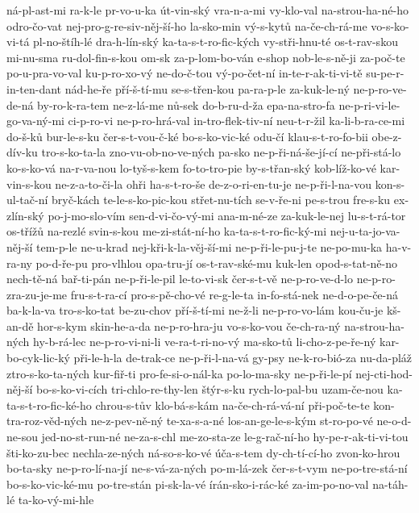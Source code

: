 {ná-pl-ast-mi
ra-k-le
pr-vo-u-ka
út-vin-ský
vra-n-a-mi
vy-klo-val
na-strou-ha-né-ho
odro-čo-vat
nej-pro-g-re-siv-něj-ší-ho
la-sko-min
vý-s-kytů
na-če-ch-rá-me
vo-s-ko-vi-tá
pl-no-štíh-lé
dra-h-lín-ský
ka-ta-s-t-ro-fic-kých
vy-stři-hnu-té
os-t-rav-skou
mi-nu-sma
ru-dol-fin-s-kou
om-sk
za-p-lom-bo-ván
e-shop
nob-le-s-ně-ji
za-poč-te
po-u-pra-vo-val
ku-p-ro-xo-vý
ne-do-č-tou
vý-po-čet-ní
in-te-r-ak-ti-vi-tě
su-pe-r-in-ten-dant
nád-he-ře
pří-š-tí-mu
se-s-třen-kou
pa-ra-p-le
za-kuk-le-ný
ne-p-ro-ve-de-ná
by-ro-k-ra-tem
ne-z-lá-me
nů-sek
do-b-ru-d-ža
epa-na-stro-fa
ne-p-ri-vi-le-go-va-ný-mi
ci-p-ro-vi
ne-p-ro-hrá-val
in-tro-flek-tiv-ní
neu-t-r-žil
ka-li-b-ra-ce-mi
do-š-ků
bur-le-s-ku
čer-s-t-vou-č-ké
bo-s-ko-vic-ké
odu-čí
klau-s-t-ro-fo-bii
obe-z-dív-ku
tro-s-ko-ta-la
zno-vu-ob-no-ve-ných
pa-sko
ne-p-ři-ná-še-jí-cí
ne-při-stá-lo
ko-s-ko-vá
na-r-va-nou
lo-tyš-s-kem
fo-to-tro-pie
by-s-třan-ský
kob-líž-ko-vé
kar-vin-s-kou
ne-z-a-to-či-la
ohři
ha-s-t-ro-še
de-z-o-ri-en-tu-je
ne-p-ři-l-na-vou
kon-s-ul-tač-ní
bryč-kách
te-le-s-ko-pic-kou
střet-nu-tích
se-v-ře-ni
pe-s-trou
fre-s-ku
ex-zlín-ský
po-j-mo-slo-vím
sen-d-vi-čo-vý-mi
ana-m-né-ze
za-kuk-le-nej
lu-s-t-rá-tor
os-třížů
na-rezlé
svin-s-kou
me-zi-stát-ní-ho
ka-ta-s-t-ro-fic-ký-mi
nej-u-ta-jo-va-něj-ší
tem-p-le
ne-u-krad
nej-kři-k-la-věj-ší-mi
ne-p-ři-le-pu-j-te
ne-po-mu-ka
ha-v-ra-ny
po-d-ře-pu
pro-vlhlou
opa-tru-jí
os-t-rav-ské-mu
kuk-len
opod-s-tat-ně-no
nech-tě-ná
bař-ti-pán
ne-p-ři-le-pil
le-to-vi-sk
čer-s-t-vě
ne-p-ro-ve-d-lo
ne-p-ro-zra-zu-je-me
fru-s-t-ra-cí
pro-s-pě-cho-vé
re-g-le-ta
in-fo-stá-nek
ne-d-o-pe-če-ná
ba-k-la-va
tro-s-ko-tat
be-zu-chov
pří-š-tí-mi
ne-ž-li
ne-p-ro-vo-lám
kou-ču-je
kš-an-dě
hor-s-kym
skin-he-a-da
ne-p-ro-hra-ju
vo-s-ko-vou
če-ch-ra-ný
na-strou-ha-ných
hy-b-rá-lec
ne-p-ro-vi-ni-li
ve-ra-t-ri-no-vý
ma-sko-tů
li-cho-z-pe-ře-ný
kar-bo-cyk-lic-ký
při-le-h-la
de-trak-ce
ne-p-ři-l-na-vá
gy-psy
ne-k-ro-bió-za
nu-da-pláž
ztro-s-ko-ta-ných
kur-fiř-ti
pro-fe-si-o-nál-ka
po-lo-ma-sky
ne-p-ři-le-pí
nej-cti-hod-něj-ší
bo-s-ko-vi-cích
tri-chlo-re-thy-len
štýr-s-ku
rych-lo-pal-bu
uzam-če-nou
ka-ta-s-t-ro-fic-ké-ho
chrou-s-tův
klo-bá-s-kám
na-če-ch-rá-vá-ní
při-poč-te-te
kon-tra-roz-věd-ných
ne-z-pev-ně-ný
te-xa-s-a-né
los-an-ge-le-s-kým
st-ro-po-vé
ne-o-d-ne-sou
jed-no-st-run-né
ne-za-s-chl
me-zo-sta-ze
le-g-rač-ní-ho
hy-pe-r-ak-ti-vi-tou
šti-ko-zu-bec
nechla-ze-ných
ná-so-s-ko-vé
úča-s-tem
dy-ch-tí-cí-ho
zvon-ko-hrou
bo-ta-sky
ne-p-ro-lí-na-jí
ne-s-vá-za-ných
po-m-lá-zek
čer-s-t-vym
ne-po-tre-stá-ní
bo-s-ko-vic-ké-mu
po-tre-stán
pi-sk-la-vé
írán-sko-i-rác-ké
za-im-po-no-val
na-táh-lé
ta-ko-vý-mi-hle
}
